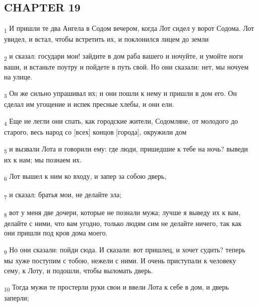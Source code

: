 \subsection{CHAPTER 19}
\begin{tcolorbox}
\textsubscript{1} И пришли те два Ангела в Содом вечером, когда Лот сидел у ворот Содома. Лот увидел, и встал, чтобы встретить их, и поклонился лицем до земли
\end{tcolorbox}
\begin{tcolorbox}
\textsubscript{2} и сказал: государи мои! зайдите в дом раба вашего и ночуйте, и умойте ноги ваши, и встаньте поутру и пойдете в путь свой. Но они сказали: нет, мы ночуем на улице.
\end{tcolorbox}
\begin{tcolorbox}
\textsubscript{3} Он же сильно упрашивал их; и они пошли к нему и пришли в дом его. Он сделал им угощение и испек пресные хлебы, и они ели.
\end{tcolorbox}
\begin{tcolorbox}
\textsubscript{4} Еще не легли они спать, как городские жители, Содомляне, от молодого до старого, весь народ со [всех] концов [города], окружили дом
\end{tcolorbox}
\begin{tcolorbox}
\textsubscript{5} и вызвали Лота и говорили ему: где люди, пришедшие к тебе на ночь? выведи их к нам; мы познаем их.
\end{tcolorbox}
\begin{tcolorbox}
\textsubscript{6} Лот вышел к ним ко входу, и запер за собою дверь,
\end{tcolorbox}
\begin{tcolorbox}
\textsubscript{7} и сказал: братья мои, не делайте зла;
\end{tcolorbox}
\begin{tcolorbox}
\textsubscript{8} вот у меня две дочери, которые не познали мужа; лучше я выведу их к вам, делайте с ними, что вам угодно, только людям сим не делайте ничего, так как они пришли под кров дома моего.
\end{tcolorbox}
\begin{tcolorbox}
\textsubscript{9} Но они сказали: пойди сюда. И сказали: вот пришлец, и хочет судить? теперь мы хуже поступим с тобою, нежели с ними. И очень приступали к человеку сему, к Лоту, и подошли, чтобы выломать дверь.
\end{tcolorbox}
\begin{tcolorbox}
\textsubscript{10} Тогда мужи те простерли руки свои и ввели Лота к себе в дом, и дверь заперли;
\end{tcolorbox}
